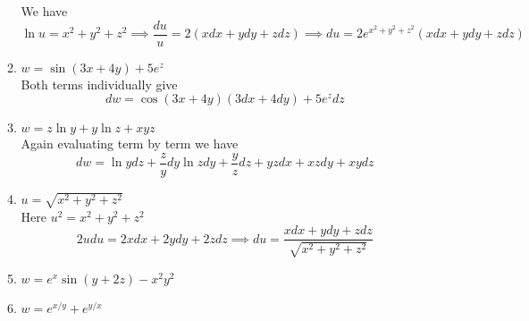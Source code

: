 \documentclass[12pt]{article}
\begin{document}
\begin{enumerate}
\begin{enumerate}
We have
$$
\ln u = x^{2} + y^{2} + z^{2} \implies \frac{du}{u} = 2(xdx + ydy + zdz) \implies du = 2e^{ x^{2} + y^{2} + z^{2} }(xdx + ydy + zdz)
$$
\item $w=\sin(3x + 4y) + 5e^{ z }$ \\
Both terms individually give
$$
dw = \cos(3x + 4y)(3dx + 4dy) + 5e^{ z }dz
$$
\item $w = z\ln y + y\ln z + xyz$ \\
Again evaluating term by term we have
$$
dw = \ln y dz + \frac{z}{y}dy \ln z dy + \frac{y}{z} dz + yzdx + xzdy + xydz
$$
\item $u = \sqrt{ x^{2} + y^{2} + z^{2} }$ \\
Here $u^{2} = x^{2} + y^{2} + z^{2}$
$$
2udu = 2xdx + 2ydy + 2zdz \implies du = \frac{xdx + ydy + zdz}{\sqrt{ x^{2} + y^{2} + z^{2} }}
$$
\item $w = e^{ x }\sin(y + 2z)-x^{2}y^{2}$ \\

\item $w = e^{ x/y } + e^{ y/x }$  \\

\end{enumerate}
\end{enumerate}
\end{document}

